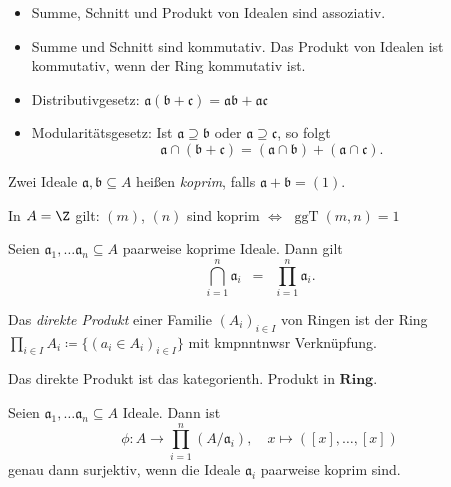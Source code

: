 \documentclass{cheat-sheet}
\DeclareMathOperator{\ggT}{ggT} %
\newcommand{\Ring}{\mathbf{Ring}} %
\newcommand{\aaa}{\mathfrak{a}}
\newcommand{\bbb}{\mathfrak{b}}
\newcommand{\ccc}{\mathfrak{c}}
\begin{document}
\begin{beob}
  \begin{itemize}
    \item Summe, Schnitt und Produkt von Idealen sind assoziativ.
    \item Summe und Schnitt sind kommutativ. Das Produkt von Idealen ist kommutativ, wenn der Ring kommutativ ist.
    \item Distributivgesetz: \enspace $\aaa (\bbb + \ccc) = \aaa \bbb + \aaa \ccc$
    \item Modularitätsgesetz: \enspace Ist $\aaa \supseteq \bbb$ oder $\aaa \supseteq \ccc$, so folgt
    \[
      \aaa \cap (\bbb + \ccc) = (\aaa \cap \bbb) + (\aaa \cap \ccc).
    \]
  \end{itemize}
\end{beob}

\begin{defn}
  Zwei Ideale $\aaa, \bbb \subseteq A$ heißen \emph{koprim}, falls $\aaa + \bbb = (1)$.
\end{defn}

\begin{bsp}
  In $A = \Z$ gilt: \enspace
  $(m)$, $(n)$ sind koprim $\iff$ $\ggT(m, n) = 1$
\end{bsp}

\begin{prop}
  Seien $\aaa_1, \ldots \aaa_n \subseteq A$ paarweise koprime Ideale.
  Dann gilt
  \[
    {\bigcap}_{i=1}^n \aaa_i
    \enspace = \enspace
    {\prod}_{i=1}^n \aaa_i.
  \]
\end{prop}


\begin{defn}
  Das \emph{direkte Produkt} einer Familie $(A_i)_{i \in I}$ von Ringen ist der Ring ${\prod}_{i \in I} A_i \coloneqq \{ (a_i \in A_i)_{i \in I} \}$ mit kmpnntnwsr Verknüpfung.
\end{defn}

\begin{bem}
  Das direkte Produkt ist das kategorienth. Produkt in $\Ring$.
\end{bem}

\begin{prop}
  Seien $\aaa_1, \ldots \aaa_n \subseteq A$ Ideale.
  Dann ist
  \[
    \phi : A \to {\prod}_{i=1}^n (A/\aaa_i), \quad x \mapsto ([x], \ldots, [x])
  \]
  genau dann surjektiv, wenn die Ideale $\aaa_i$ paarweise koprim sind.
\end{prop}
\end{document}
